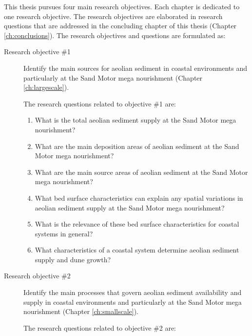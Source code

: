 This thesis pursues four main research objectives. Each chapter is
dedicated to one research objective. The research objectives are
elaborated in research questions that are addressed in the concluding
chapter of this thesis (Chapter \ref{ch:conclusions}). The research
objectives and questions are formulated as:

\begin{description}
\item[Research objective \#1] Identify the main sources for aeolian
  sediment in coastal environments and particularly at the Sand Motor
  mega nourishment (Chapter \ref{ch:largescale}).

  \medskip

  The research questions related to objective \#1 are:

  \begin{enumerate}[{1.}1]
  \item \label{q:1.2} What is the total aeolian sediment
    supply at the Sand Motor mega nourishment?
  \item \label{q:1.3} What are the main deposition areas of
    aeolian sediment at the Sand Motor mega nourishment?
  \item \label{q:1.4} What are the main source areas of
    aeolian sediment at the Sand Motor mega nourishment?
  \item \label{q:1.5} What bed surface characteristics can
    explain any spatial variations in aeolian sediment supply at the
    Sand Motor mega nourishment?
  \item \label{q:1.6} What is the relevance of these bed
    surface characteristics for coastal systems in general?
  \item \label{q:1.7} What characteristics of a coastal system
    determine aeolian sediment supply and dune growth?
  \end{enumerate}

  \bigskip

\item[Research objective \#2] Identify the main processes that govern
  aeolian sediment availability and supply in coastal environments and
  particularly at the Sand Motor mega nourishment (Chapter
  \ref{ch:smallscale}).

  \medskip

  The research questions related to objective \#2 are:


\end{description}
